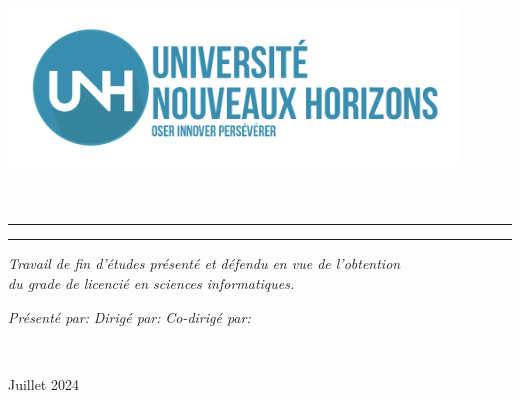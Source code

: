 \begin{titlepage}
    \begin{center}
        \large
        
        \vspace*{.03\textheight}
        \includegraphics[width=12cm]{Images/logo_unh} \\[0.75cm]
        
        {\LARGE{{\textsc{\myFaculty}}} }\\[0.2cm]
        
        {\LARGE{{{\myDepartment}}} }\\
        \medskip %
        
        \vspace{2.5cm} 
        \begin{center}
            \rule{0.9\textwidth}{.2pt}
        \end{center}
        \vspace{0.2cm}
        
        {\LARGE \bfseries {\myTitle}}
        
        \begin{center}
            \rule{0.9\textwidth}{.2pt}
        \end{center}

        \begin{flushright}
            {\slshape \textit{Travail de fin d’études présenté et défendu en vue de l’obtention\\ du grade de licencié en sciences informatiques.}}\\[2cm] 
        \end{flushright}
        
        \begin{minipage}[t]{0.55\textwidth}
            \begin{flushright}
                \large
                \emph{Présenté par:} \textbf{{\myName}}
                \emph{Dirigé par:} \textbf{{\myProf}}  
                \emph{Co-dirigé par:} \textbf{{\mySupervisor}} 
            \end{flushright}
        \end{minipage}\\[3cm]
        \vfill
        
        {\large Juillet 2024}\\
    \end{center}
\end{titlepage}
